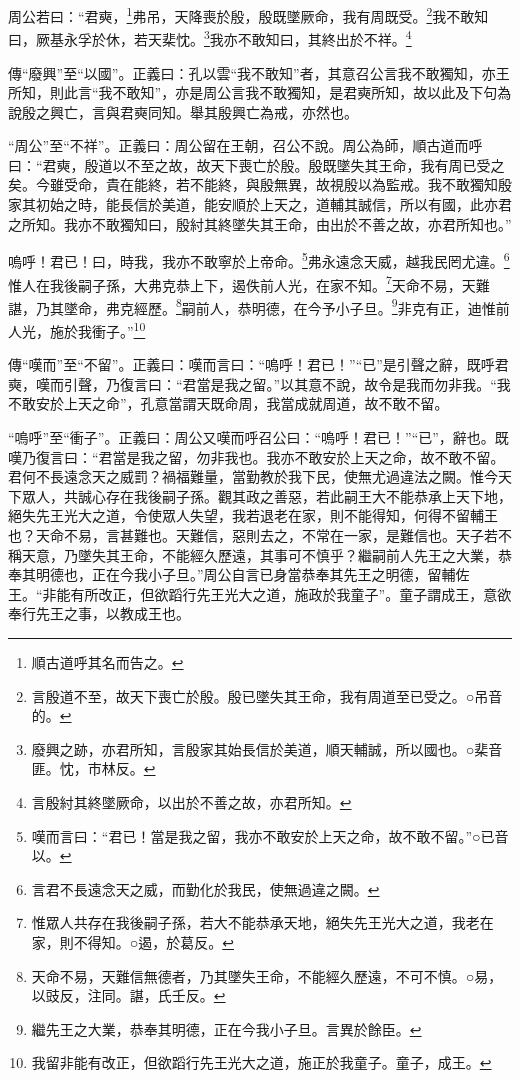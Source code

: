 周公若曰：“君奭，\footnote{順古道呼其名而告之。}弗吊，天降喪於殷，殷既墜厥命，我有周既受。\footnote{言殷道不至，故天下喪亡於殷。殷已墜失其王命，我有周道至已受之。○吊音的。}我不敢知曰，厥基永孚於休，若天棐忱。\footnote{廢興之跡，亦君所知，言殷家其始長信於美道，順天輔誠，所以國也。○棐音匪。忱，市林反。}我亦不敢知曰，其終出於不祥。\footnote{言殷紂其終墜厥命，以出於不善之故，亦君所知。}


{\noindent\zhuan{}\fzbyks 傳“廢興”至“以國”。正義曰：孔以雲“我不敢知”者，其意召公言我不敢獨知，亦王所知，則此言“我不敢知”，亦是周公言我不敢獨知，是君奭所知，故以此及下句為說殷之興亡，言與君奭同知。舉其殷興亡為戒，亦然也。 \par}

{\noindent\shu{}\fzkt “周公”至“不祥”。正義曰：周公留在王朝，召公不說。周公為師，順古道而呼曰：“君奭，殷道以不至之故，故天下喪亡於殷。殷既墜失其王命，我有周已受之矣。今雖受命，貴在能終，若不能終，與殷無異，故視殷以為監戒。我不敢獨知殷家其初始之時，能長信於美道，能安順於上天之，道輔其誠信，所以有國，此亦君之所知。我亦不敢獨知曰，殷紂其終墜失其王命，由出於不善之故，亦君所知也。” \par}

嗚呼！君已！曰，時我，我亦不敢寧於上帝命。\footnote{嘆而言曰：“君已！當是我之留，我亦不敢安於上天之命，故不敢不留。”○已音以。}弗永遠念天威，越我民罔尤違。\footnote{言君不長遠念天之威，而勤化於我民，使無過違之闕。}惟人在我後嗣子孫，大弗克恭上下，遏佚前人光，在家不知。\footnote{惟眾人共存在我後嗣子孫，若大不能恭承天地，絕失先王光大之道，我老在家，則不得知。○遏，於葛反。}天命不易，天難諶，乃其墜命，弗克經歷。\footnote{天命不易，天難信無德者，乃其墜失王命，不能經久歷遠，不可不慎。○易，以豉反，注同。諶，氏壬反。}嗣前人，恭明德，在今予小子旦。\footnote{繼先王之大業，恭奉其明德，正在今我小子旦。言異於餘臣。}非克有正，迪惟前人光，施於我衝子。”\footnote{我留非能有改正，但欲蹈行先王光大之道，施正於我童子。童子，成王。}


{\noindent\zhuan{}\fzbyks 傳“嘆而”至“不留”。正義曰：嘆而言曰：“嗚呼！君已！”“已”是引聲之辭，既呼君奭，嘆而引聲，乃復言曰：“君當是我之留。”以其意不說，故令是我而勿非我。“我不敢安於上天之命”，孔意當謂天既命周，我當成就周道，故不敢不留。 \par}

{\noindent\shu{}\fzkt “嗚呼”至“衝子”。正義曰：周公又嘆而呼召公曰：“嗚呼！君已！”“已”，辭也。既嘆乃復言曰：“君當是我之留，勿非我也。我亦不敢安於上天之命，故不敢不留。君何不長遠念天之威罰？禍福難量，當勤教於我下民，使無尤過違法之闕。惟今天下眾人，共誠心存在我後嗣子孫。觀其政之善惡，若此嗣王大不能恭承上天下地，絕失先王光大之道，令使眾人失望，我若退老在家，則不能得知，何得不留輔王也？天命不易，言甚難也。天難信，惡則去之，不常在一家，是難信也。天子若不稱天意，乃墜失其王命，不能經久歷遠，其事可不慎乎？繼嗣前人先王之大業，恭奉其明德也，正在今我小子旦。”周公自言已身當恭奉其先王之明德，留輔佐王。“非能有所改正，但欲蹈行先王光大之道，施政於我童子”。童子謂成王，意欲奉行先王之事，以教成王也。 \par}

